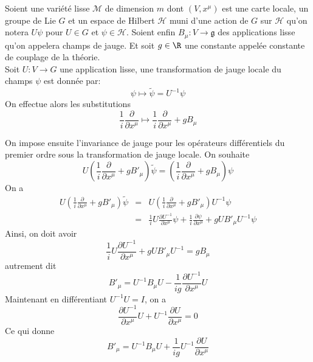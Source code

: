 Soient une variété lisse $\mathcal{M}$ de dimension $m$ dont $(V, x^\mu)$ est une carte locale, un groupe de Lie $G$ et un espace de Hilbert $\mathcal{H}$ muni d'une action de $G$ sur $\mathcal{H}$ qu'on notera $U\psi$ pour $U \in G$ et $\psi \in \mathcal{H}$. Soient enfin $B_\mu : V \to \mathfrak{g}$ des applications lisse qu'on appelera champs de jauge. Et soit $g\in \R$ une constante appelée constante de couplage de la théorie. \\

Soit $U: V\to G$ une application lisse, une transformation de jauge locale du champs $\psi$ est donnée par:
$$\psi \mapsto \tilde{\psi} = U^{-1}\psi$$
On effectue alors les substitutions
$$\frac{1}{i}\frac{\partial}{\partial x^\mu} \mapsto \frac{1}{i}\frac{\partial}{\partial x^\mu} + g B_\mu$$

On impose ensuite l'invariance de jauge pour les opérateurs différentiels du premier ordre sous la transformation de jauge locale. On souhaite
$$U\left(\frac{1}{i}\frac{\partial}{\partial x^\mu} + g B'_\mu\right)\tilde{\psi} = \left(\frac{1}{i}\frac{\partial}{\partial x^\mu} + g B_\mu\right)\psi$$
On a 
\begin{eqnarray*}
U\left(\frac{1}{i}\frac{\partial}{\partial x^\mu} + g B'_\mu\right)\tilde{\psi} &=& U\left(\frac{1}{i}\frac{\partial}{\partial x^\mu} + g B'_\mu\right)U^{-1}\psi \\
&=& \frac{1}{i}U\frac{\partial U^{-1}}{\partial x^\mu}\psi + \frac{1}{i}\frac{\partial \psi}{\partial x^\mu} + gUB'_\mu U^{-1}\psi
\end{eqnarray*}
Ainsi, on doit avoir
$$\frac{1}{i}U\frac{\partial U^{-1}}{\partial x^\mu} + gUB'_\mu U^{-1} = gB_\mu$$
autrement dit
$$B'_\mu = U^{-1}B_\mu U - \frac{1}{ig}\frac{\partial U^{-1}}{\partial x^\mu}U$$
Maintenant en différentiant $U^{-1}U = I$, on a 
$$\frac{\partial U^{-1}}{\partial x^\mu}U + U^{-1}\frac{\partial U}{\partial x^\mu} = 0$$
Ce qui donne 
$$B'_\mu = U^{-1}B_\mu U + \frac{1}{ig}U^{-1}\frac{\partial U}{\partial x^\mu}$$ 

